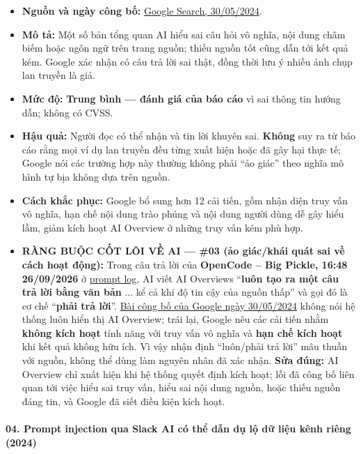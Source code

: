 \begin{itemize}
\tightlist
\item
  \textbf{Nguồn và ngày công bố:} \href{https://blog.google/products-and-platforms/products/search/ai-overviews-update-may-2024/}{Google Search, 30/05/2024}.
\item
  \textbf{Mô tả:} Một số bản tổng quan AI hiểu sai câu hỏi vô nghĩa, nội dung châm biếm hoặc ngôn ngữ trên trang nguồn; thiếu nguồn tốt cũng dẫn tới kết quả kém. Google xác nhận có câu trả lời sai thật, đồng thời lưu ý nhiều ảnh chụp lan truyền là giả.
\item
  \textbf{Mức độ:} \textbf{Trung bình --- đánh giá của báo cáo} vì sai thông tin hướng dẫn; không có CVSS.
\item
  \textbf{Hậu quả:} Người đọc có thể nhận và tin lời khuyên sai. \textbf{Không} suy ra từ báo cáo rằng mọi ví dụ lan truyền đều từng xuất hiện hoặc đã gây hại thực tế; Google nói các trường hợp này thường không phải ``ảo giác'' theo nghĩa mô hình tự bịa không dựa trên nguồn.
\item
  \textbf{Cách khắc phục:} Google bổ sung hơn 12 cải tiến, gồm nhận diện truy vấn vô nghĩa, hạn chế nội dung trào phúng và nội dung người dùng dễ gây hiểu lầm, giảm kích hoạt AI Overview ở những truy vấn kém phù hợp.
\item
  \textbf{RÀNG BUỘC CỐT LÕI VỀ AI --- \#03 (ảo giác/khái quát sai về cách hoạt động):} Trong câu trả lời của \textbf{OpenCode -- Big Pickle, 16:48 26/09/2026} ở \href{Appendix_A_Prompt_Log.md}{prompt log}, AI viết AI Overviews ``\textbf{luôn tạo ra một câu trả lời bằng văn bản} ... kể cả khi độ tin cậy của nguồn thấp'' và gọi đó là cơ chế ``\textbf{phải trả lời}''. \href{https://blog.google/products-and-platforms/products/search/ai-overviews-update-may-2024/}{Bài công bố của Google ngày 30/05/2024} không nói hệ thống luôn hiển thị AI Overview; trái lại, Google nêu các cải tiến nhằm \textbf{không kích hoạt} tính năng với truy vấn vô nghĩa và \textbf{hạn chế kích hoạt} khi kết quả không hữu ích. Vì vậy nhận định ``luôn/phải trả lời'' mâu thuẫn với nguồn, không thể dùng làm nguyên nhân đã xác nhận. \textbf{Sửa đúng:} AI Overview chỉ xuất hiện khi hệ thống quyết định kích hoạt; lỗi đã công bố liên quan tới việc hiểu sai truy vấn, hiểu sai nội dung nguồn, hoặc thiếu nguồn đáng tin, và Google đã siết điều kiện kích hoạt.
\end{itemize}

\paragraph{04. Prompt injection qua Slack AI có thể dẫn dụ lộ dữ liệu kênh riêng (2024)}\label{prompt-injection-qua-slack-ai-cuxf3-thux1ec3-dux1eabn-dux1ee5-lux1ed9-dux1eef-liux1ec7u-kuxeanh-riuxeang-2024}


